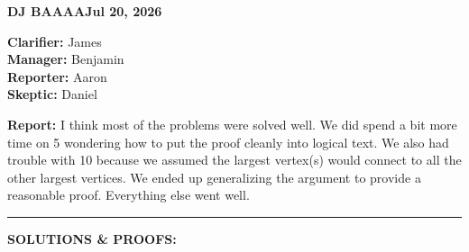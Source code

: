 \documentclass[11pt]{article}
\theoremstyle{solstyle}
\begin{document}
\noindent\textbf{DJ BAAAA}\hfill\textbf{Jul 20, 2026}

\noindent\textbf{Clarifier:} James\\
\textbf{Manager:} Benjamin\\
\textbf{Reporter:} Aaron\\
\textbf{Skeptic:} Daniel

\textbf{Report:} I think most of the problems were solved well. We did spend a bit more time on 5 wondering how to put the proof cleanly into logical text. We also had trouble with 10 because we assumed the largest vertex(s) would connect to all the other largest vertices. We ended up generalizing the argument to provide a reasonable proof. Everything else went well. 

\begin{center}\rule{0.6\textwidth}{0.4pt}\end{center}

\textbf{SOLUTIONS \& PROOFS:}
\end{document}
